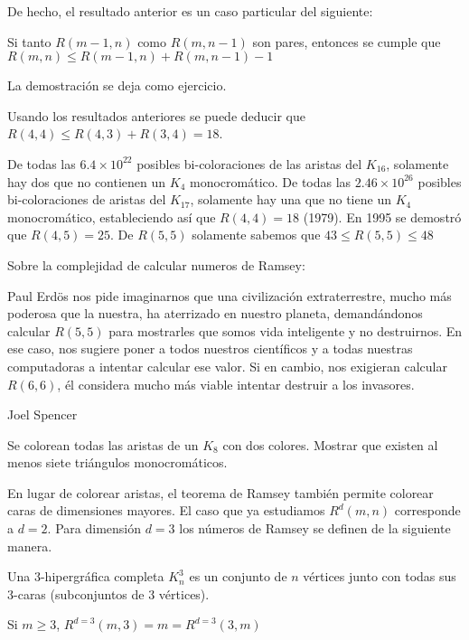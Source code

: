 De hecho, el resultado anterior es un caso particular del siguiente:

\begin{proposicion}
Si tanto $R(m-1,n)$ como $R(m,n-1)$ son pares, entonces se cumple que $R(m,n)\leq R(m-1,n)+R(m,n-1)-1$
\end{proposicion}
La demostración se deja como ejercicio.
\vspace{2cm}

Usando los resultados anteriores se puede deducir que $R(4,4)\leq R(4,3)+R(3,4)=18$.

De todas las $6.4\times 10^{22}$ posibles bi-coloraciones de las aristas del $K_{16}$, solamente hay dos que no contienen un $K_4$ monocromático. De todas las $2.46 \times 10^{26}$ posibles bi-coloraciones de aristas del $K_{17}$, solamente hay una que no tiene un $K_4$ monocromático, estableciendo así que $R(4,4)=18$ (1979). En 1995 se demostró que $R(4,5)=25$. De $R(5,5)$ solamente sabemos que $43\leq R(5,5)\leq 48$

Sobre la complejidad de calcular numeros de Ramsey:

\epigraph{Paul Erdös nos pide imaginarnos que una civilización extraterrestre, mucho más poderosa que la nuestra, ha aterrizado en nuestro planeta, demandándonos calcular $R(5,5)$ para mostrarles que somos vida inteligente y no destruirnos. En ese caso, nos sugiere poner a todos nuestros científicos y a todas nuestras computadoras a intentar calcular ese valor. Si en cambio, nos exigieran calcular $R(6,6)$, él considera mucho más viable intentar destruir a los invasores.}{Joel Spencer}

\begin{problema}
[OMM '98] Se colorean todas las aristas de un $K_8$ con dos colores. Mostrar que existen al menos siete triángulos monocromáticos.
\end{problema}
\vspace{2cm}

En lugar de colorear aristas, el teorema de Ramsey también permite colorear caras de dimensiones mayores. El caso que ya estudiamos $R^d(m,n)$ corresponde a $d=2$. Para dimensión $d=3$ los números de Ramsey se definen de la siguiente manera.

Una $3$-hipergráfica completa $K^3_n$ es un conjunto de $n$ vértices junto con todas sus 3-caras (subconjuntos de 3 vértices).

\begin{ejercicio}
Si $m\geq 3$, $R^{d=3}(m,3)=m=R^{d=3}(3,m)$
\end{ejercicio}
\vspace{2cm}

